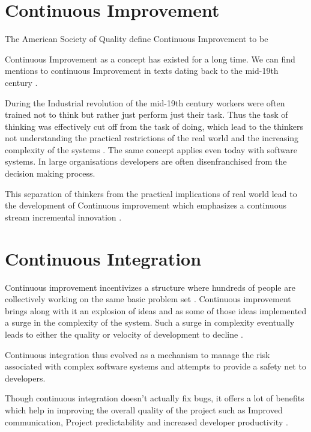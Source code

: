 \documentclass[10pt,conference]{IEEEtran}
\begin{document}
\section*{Continuous Improvement}

The American Society of Quality define Continuous Improvement to be 
 \cite{american_society_for_quality_continuous_????}

Continuous Improvement as a concept has existed for a long time. We can find mentions to continuous Improvement in texts dating back to the mid-19th century \cite{schroeder_americas_????}. 

During the Industrial revolution of the mid-19th century workers were often trained not to think but rather just perform just their task. Thus the task of thinking was effectively cut off from the task of doing, which lead to the thinkers not understanding the practical restrictions of the real world and the increasing complexity of the systems \cite{schroeder_americas_????}. The same concept applies even today with software systems. In large organisations developers are often disenfranchised from the decision making process.

This separation of thinkers from the practical implications of real world lead to the development of Continuous improvement which emphasizes a continuous stream incremental innovation \cite{bessant_rediscovering_1994}.

\section*{Continuous Integration}

Continuous improvement incentivizes a structure where hundreds of people are collectively working on the same basic problem set \cite{bessant_rediscovering_1994}. Continuous improvement brings along with it an explosion of ideas and as some of those ideas implemented a surge in the complexity of the system. Such a surge in complexity eventually leads to either the quality or velocity of development to decline \cite{zaytsev_increasing_2013} . 

Continuous integration thus evolved as a mechanism to manage the risk associated with complex software systems \cite{zaytsev_increasing_2013} and  attempts to provide a safety net \cite{fowler_continuous_2006} to developers. 

Though continuous integration doesn't actually fix bugs, it offers a lot of benefits which help in improving the overall quality of the project such as Improved communication, Project predictability and increased developer productivity \cite{sta_ahl_experienced_2013}.
\end{document}
